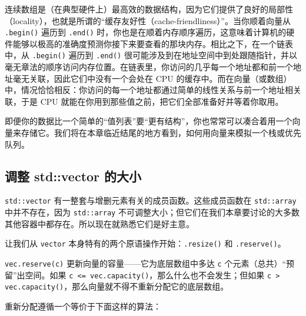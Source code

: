 连续数组是（在典型硬件上）最高效的数据结构，因为它们提供了良好的局部性（locality），也就是所谓的“缓存友好性（cache-friendliness）”。当你顺着向量从 \texttt{.begin(\allowbreak{})\allowbreak{}} 遍历到 \texttt{.end(\allowbreak{})\allowbreak{}} 时，你也是在顺着内存顺序遍历，这意味着计算机的硬件能够以极高的准确度预测你接下来要查看的那块内存。相比之下，在一个链表中，从 \texttt{.begin(\allowbreak{})\allowbreak{}} 遍历到 \texttt{.end(\allowbreak{})\allowbreak{}} 很可能涉及到在地址空间中到处跟随指针，并以毫无章法的顺序访问内存位置。在链表里，你访问的几乎每一个地址都和前一个地址毫无关联，因此它们中没有一个会处在 CPU 的缓存中。而在向量（或数组）中，情况恰恰相反：你访问的每一个地址都通过简单的线性关系与前一个地址相关联，于是 CPU 就能在你用到那些值之前，把它们全部准备好并等着你取用。

即便你的数据比一个简单的“值列表”要“更有结构”，你也常常可以凑合着用一个向量来存储它。我们将在本章临近结尾的地方看到，如何用向量来模拟一个栈或优先队列。

\subsection{调整 std::vector 的大小}

\texttt{std::\allowbreak{}vector} 有一整套与增删元素有关的成员函数。这些成员函数在 \texttt{std::\allowbreak{}array} 中并不存在，因为 \texttt{std::\allowbreak{}array} 不可调整大小；但它们在我们本章要讨论的大多数其他容器中都存在。所以现在就熟悉它们是好主意。

让我们从 \texttt{vector} 本身特有的两个原语操作开始：\texttt{.resize(\allowbreak{})\allowbreak{}} 和 \texttt{.reserve(\allowbreak{})\allowbreak{}}。

\texttt{vec.\allowbreak{}reserve(\allowbreak{}c)\allowbreak{}} 更新向量的容量——它为底层数组中多达 \texttt{c} 个元素（总共）“预留”出空间。如果 \texttt{c <= vec.\allowbreak{}capacity(\allowbreak{})\allowbreak{}}，那么什么也不会发生；但如果 \texttt{c > vec.\allowbreak{}capacity(\allowbreak{})\allowbreak{}}，那么向量就不得不重新分配它的底层数组。

重新分配遵循一个等价于下面这样的算法：

